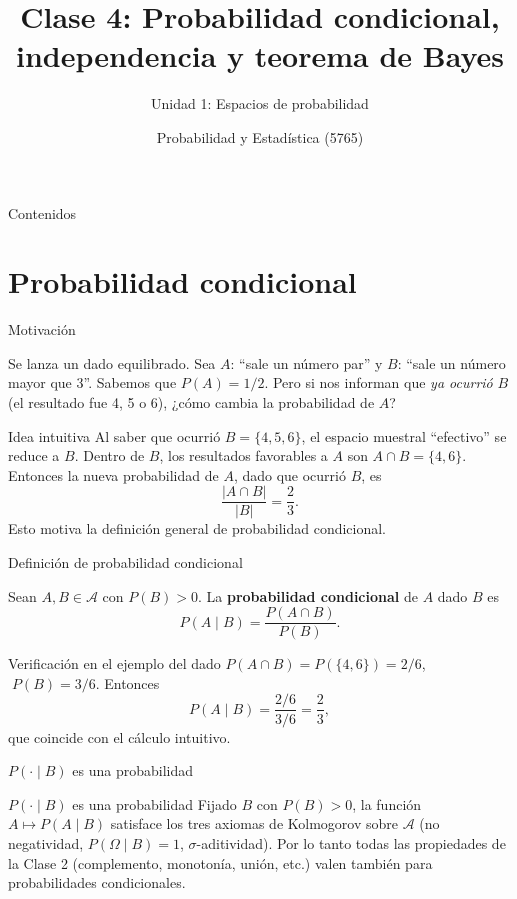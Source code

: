 \documentclass[aspectratio=169,11pt]{beamer}
\title[Prob. y Estadística]{Clase 4: Probabilidad condicional, independencia y teorema de Bayes}
\subtitle{Unidad 1: Espacios de probabilidad}
\institute[UNS]{Universidad Nacional del Sur \\ Departamento de Matemática}
\author{Probabilidad y Estadística (5765)}
\date{}
\begin{document}
\begin{frame}
\titlepage
\end{frame}

\begin{frame}{Contenidos}
\tableofcontents
\end{frame}

\section{Probabilidad condicional}

\begin{frame}{Motivación}
\begin{example}
Se lanza un dado equilibrado. Sea $A$: ``sale un número par'' y $B$: ``sale un número mayor que 3''. Sabemos que $P(A)=1/2$. Pero si nos informan que \emph{ya ocurrió} $B$ (el resultado fue 4, 5 o 6), ¿cómo cambia la probabilidad de $A$?
\end{example}
\begin{block}{Idea intuitiva}
Al saber que ocurrió $B=\{4,5,6\}$, el espacio muestral ``efectivo'' se reduce a $B$. Dentro de $B$, los resultados favorables a $A$ son $A\cap B = \{4,6\}$. Entonces la nueva probabilidad de $A$, dado que ocurrió $B$, es
\[
\frac{|A\cap B|}{|B|} = \frac{2}{3}.
\]
Esto motiva la definición general de probabilidad condicional.
\end{block}
\end{frame}

\begin{frame}{Definición de probabilidad condicional}
\begin{definition}
Sean $A, B \in \mathcal{A}$ con $P(B) > 0$. La \textbf{probabilidad condicional} de $A$ dado $B$ es
\[
P(A \mid B) = \frac{P(A \cap B)}{P(B)}.
\]
\end{definition}
\begin{alertblock}{Verificación en el ejemplo del dado}
$P(A\cap B) = P(\{4,6\}) = 2/6$, $\; P(B) = 3/6$. Entonces
\[
P(A\mid B) = \frac{2/6}{3/6} = \frac{2}{3},
\]
que coincide con el cálculo intuitivo.
\end{alertblock}
\end{frame}

\begin{frame}{$P(\cdot \mid B)$ es una probabilidad}
\begin{block}{$P(\cdot \mid B)$ es una probabilidad}
Fijado $B$ con $P(B)>0$, la función $A \mapsto P(A\mid B)$ satisface los tres axiomas de Kolmogorov sobre $\mathcal{A}$ (no negatividad, $P(\Omega\mid B)=1$, $\sigma$-aditividad). Por lo tanto todas las propiedades de la Clase 2 (complemento, monotonía, unión, etc.) valen también para probabilidades condicionales.
\end{block}
\end{frame}
\end{document}
